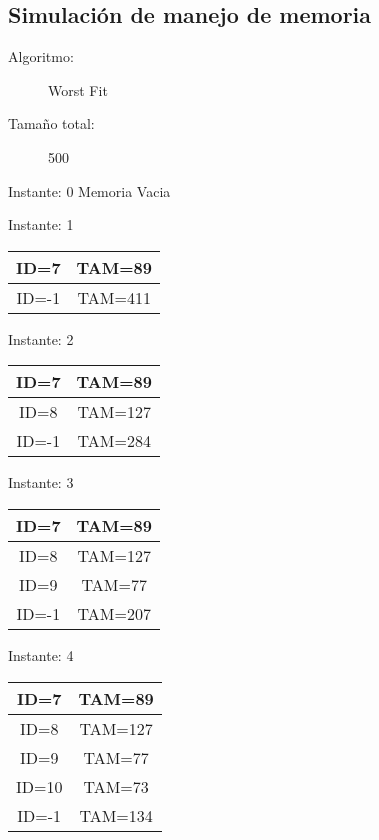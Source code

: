 \documentclass[10pt,a4paper]{article}
\begin{document}
\begin{center}
\section*{Simulación de manejo de memoria}
\begin{description}
\item[Algoritmo:] Worst Fit 
\item[Tamaño total:] 500 
\end{description}
\end{center}
\begin{center}
Instante: 0
Memoria Vacia\\
\end{center}

\begin{center}

Instante: 1

\begin{tabular}{|c|c|}
\hline
ID=7 & TAM=89 \\ \hline
ID=-1 & TAM=411 \\ \hline
\end{tabular}
\end{center}\pagebreak
\begin{center}

Instante: 2

\begin{tabular}{|c|c|}
\hline
ID=7 & TAM=89 \\ \hline
ID=8 & TAM=127 \\ \hline
ID=-1 & TAM=284 \\ \hline
\end{tabular}
\end{center}\pagebreak
\begin{center}

Instante: 3

\begin{tabular}{|c|c|}
\hline
ID=7 & TAM=89 \\ \hline
ID=8 & TAM=127 \\ \hline
ID=9 & TAM=77 \\ \hline
ID=-1 & TAM=207 \\ \hline
\end{tabular}
\end{center}\pagebreak
\begin{center}

Instante: 4

\begin{tabular}{|c|c|}
\hline
ID=7 & TAM=89 \\ \hline
ID=8 & TAM=127 \\ \hline
ID=9 & TAM=77 \\ \hline
ID=10 & TAM=73 \\ \hline
ID=-1 & TAM=134 \\ \hline
\end{tabular}
\end{center}\pagebreak
\end{document}
